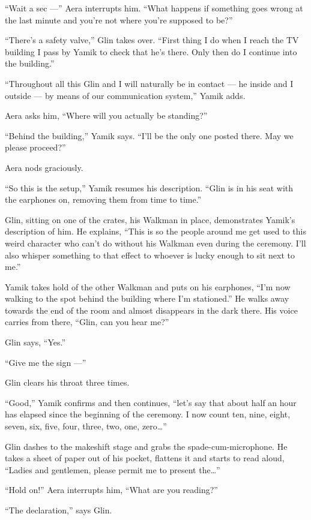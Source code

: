 \documentclass[twoside,11pt,openany]{book}
\begin{document}
``Wait a sec ---'' Aera interrupts him. ``What happens if something goes wrong
at the last minute and you're not where you're supposed to be?''

``There's a safety valve,'' Glin takes over. ``First thing I do when I reach the
TV building I pass by Yamik to check that he's there. Only then do I continue into the building.''

``Throughout all this Glin and I will naturally be in contact --- he inside and I outside ---  by means of
our communication system,'' Yamik adds.

Aera asks him, ``Where will you actually be standing?''

``Behind the building,'' Yamik says. ``I'll be the only one posted
there.  May we please proceed?''

Aera nods graciously.

``So this is the setup,'' Yamik resumes his description. ``Glin is in his seat
with the earphones on, removing them from time to time.''

Glin, sitting on one of the crates, his Walkman in place, demonstrates Yamik's description of him. He explains,
``This is so the{ }people around me get used to this weird
character who can't do without his Walkman even during the ceremony. I'll also whisper something to that effect to
whoever is lucky enough to sit next to me.''

Yamik takes hold of the other Walkman and puts on his earphones, ``I'm now walking to the spot behind the
building where I'm stationed.'' He walks away towards the end of the room and almost disappears in the
dark there. His voice carries from there, ``Glin, can you hear me?''

Glin says, ``Yes.''

``Give me the sign ---''

Glin clears his throat three times.

``Good,'' Yamik confirms and then continues, ``let's say that about half an hour
has elapsed since the beginning of the ceremony. I now count ten, nine, eight, seven, six, five, four, three, two, one,
zero{\ldots}''

Glin dashes to the makeshift stage and grabs the spade-cum-micro\-phone.
He takes a sheet of paper out
of his pocket, flattens it and starts to read aloud, ``Ladies and gentlemen, please permit me to present
the{\ldots}''

``Hold on!'' Aera interrupts him, ``What are you reading?''

``The declaration,'' says Glin.
\end{document}
